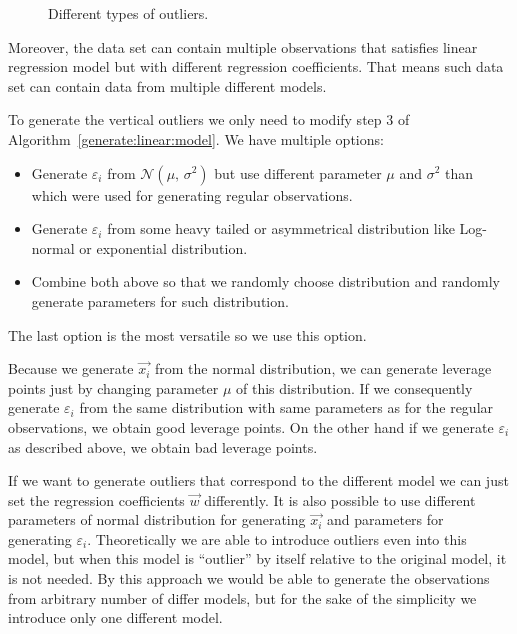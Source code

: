 \begin{figure}[h]

    \caption{Different types of outliers.  }
    \label{outliers:types:figure}
\end{figure}

Moreover, the data set can contain multiple observations that satisfies linear regression model but with different regression coefficients. That means such data set can contain data from multiple different models.

To generate the vertical outliers we only need to modify step $3$ of Algorithm~\ref{generate:linear:model}. We have multiple options:
\begin{itemize}
    \item Generate $\varepsilon_i$ from $\mathcal{N}(\mu,\,\sigma^{2})$ but use different parameter  $\mu$ and $\sigma^{2}$ than which were used for generating regular observations.
    \item Generate $\varepsilon_i$ from some heavy tailed or asymmetrical distribution like  Log-normal or exponential distribution.
    \item Combine both above so that we randomly choose distribution and randomly generate parameters for such distribution.
\end{itemize}
The last option is the most versatile so we use this option. 

Because we generate $\vec{x_i}$ from the normal distribution, we can generate leverage points just by changing parameter $\mu$  of this distribution. If we consequently generate $\varepsilon_i$ from the same distribution with same parameters as for the regular observations, we obtain good leverage points. On the other hand if we generate $\varepsilon_i$ as described above, we obtain bad leverage points.

If we want to generate outliers that correspond to the different model we can just set the regression coefficients $\vec{w}$ differently. It is also possible to use different parameters of normal distribution for generating $\vec{x_i}$ and parameters for generating $\varepsilon_i$. Theoretically we are able to introduce outliers even into this model, but when this model is ``outlier'' by itself relative to the original model, it is not needed. By this approach we would be able to generate the observations from arbitrary number of differ models, but for the sake of the simplicity we introduce only one different model. 

